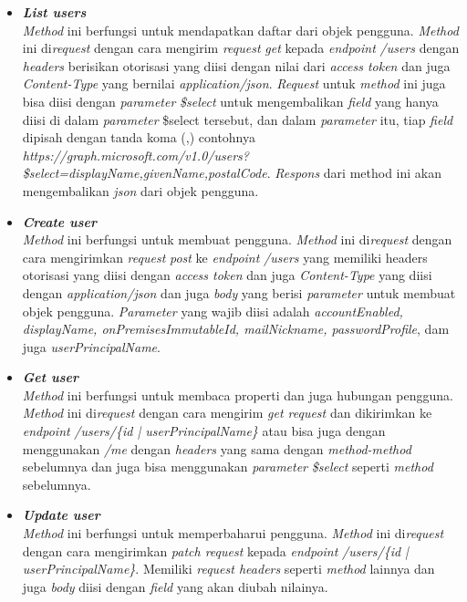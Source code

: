\begin{itemize}
	\item \textbf{\textit{List users}}\\
	\textit{Method} ini berfungsi untuk mendapatkan daftar dari objek pengguna. \textit{Method} ini di\textit{request} dengan cara mengirim \textit{request} \textit{get} kepada \textit{endpoint} \textit{/users} dengan \textit{headers} berisikan otorisasi yang diisi dengan nilai dari \textit{access token} dan juga \textit{Content-Type} yang bernilai \textit{application/json}. \textit{Request} untuk \textit{method} ini juga bisa diisi dengan \textit{parameter} \textit{\$select} untuk mengembalikan \textit{field} yang hanya diisi di dalam \textit{parameter} \$select tersebut, dan dalam \textit{parameter} itu, tiap \textit{field} dipisah dengan tanda koma (,) contohnya \textit{https://graph.microsoft.com/v1.0/users?\$select=displayName,givenName,postalCode}.  \textit{Respons} dari method ini akan mengembalikan \textit{json} dari objek pengguna. 
	\item \textbf{\textit{Create user}}\\
	\textit{Method} ini berfungsi untuk membuat pengguna. \textit{Method} ini di\textit{request} dengan cara mengirimkan \textit{request} \textit{post} ke \textit{endpoint} \textit{/users} yang memiliki headers otorisasi yang diisi dengan \textit{access token} dan juga \textit{Content-Type} yang diisi dengan \textit{application/json} dan juga \textit{body} yang berisi \textit{parameter} untuk membuat objek pengguna. \textit{Parameter} yang wajib diisi adalah \textit{accountEnabled, displayName, onPremisesImmutableId, mailNickname, passwordProfile}, dam juga \textit{userPrincipalName}.  
	\item \textbf{\textit{Get user}}\\
	\textit{Method} ini berfungsi untuk membaca properti dan juga hubungan pengguna. \textit{Method} ini di\textit{request} dengan cara mengirim \textit{get request} dan dikirimkan ke \textit{endpoint} \textit{/users/\{id | userPrincipalName\}} atau bisa juga dengan menggunakan \textit{/me} dengan \textit{headers} yang sama dengan \textit{method-method} sebelumnya dan juga bisa menggunakan \textit{parameter} \textit{\$select} seperti \textit{method} sebelumnya.  
	\item \textbf{\textit{Update user}}\\
	\textit{Method} ini berfungsi untuk memperbaharui pengguna. \textit{Method} ini di\textit{request} dengan cara mengirimkan \textit{patch request} kepada \textit{endpoint} \textit{/users/\{id | userPrincipalName\}}. Memiliki \textit{request headers} seperti \textit{method} lainnya dan juga \textit{body} diisi dengan \textit{field} yang akan diubah nilainya. 

\end{itemize}
